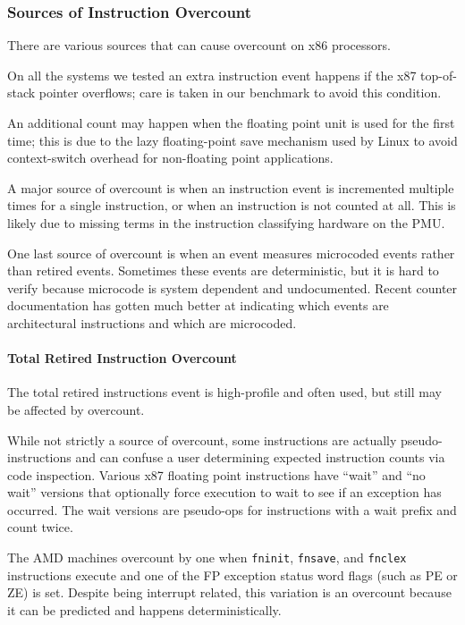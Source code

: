 \subsubsection{Sources of Instruction Overcount}

There are various sources that can cause overcount on x86 processors.

On all the systems we tested an extra instruction event happens if the 
x87 top-of-stack pointer overflows; care is taken in our benchmark to 
avoid this condition.  

An additional count may happen when the floating point unit is 
used for the first time; this is due to
the lazy floating-point save mechanism used by Linux to avoid context-switch 
overhead for non-floating point applications.  

A major source of overcount is when an instruction event is incremented
multiple times for a single instruction, or when an instruction
is not counted at all.  This is likely due to missing terms in the
instruction classifying hardware on the PMU.

One last source of overcount is when an event measures microcoded events
rather than retired events.  Sometimes these events are deterministic,
but it is hard to verify because microcode is system dependent and
undocumented.  Recent counter documentation has gotten much better
at indicating which events are architectural instructions and which 
are microcoded.

\paragraph {Total Retired Instruction Overcount}

The total retired instructions event is high-profile and often used,
but still may be affected by overcount.

While not strictly a source of overcount, some instructions are
actually pseudo-instructions and can confuse a user 
determining expected instruction counts
via code inspection.
Various x87 floating point instructions have ``wait'' and ``no wait''
versions that optionally force execution to wait to see if an exception
has occurred.  
The wait versions are pseudo-ops for instructions with a wait prefix
and count twice.

The AMD machines overcount by one when
{\tt fninit}, {\tt fnsave}, and {\tt fnclex} instructions execute
and one of the FP exception status word flags (such as PE or ZE) is set.
Despite being interrupt related, this variation
is an overcount because it can be predicted and happens deterministically.

